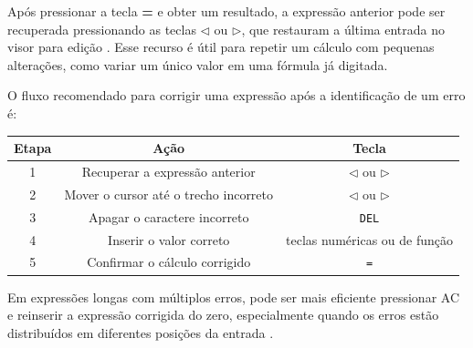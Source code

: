 Após pressionar a tecla \textbf{=} e obter um resultado, a expressão anterior pode ser recuperada pressionando as teclas $\triangleleft$ ou $\triangleright$, que restauram a última entrada no visor para edição \cite{casio2004}. Esse recurso é útil para repetir um cálculo com pequenas alterações, como variar um único valor em uma fórmula já digitada.

O fluxo recomendado para corrigir uma expressão após a identificação de um erro é:

\begin{table}[H]
    \centering
    \begin{tabular}{|c|c|c|}
        \hline
        \textbf{Etapa} & \textbf{Ação} & \textbf{Tecla} \\ \hline
        1 & Recuperar a expressão anterior & $\triangleleft$ ou $\triangleright$ \\
        2 & Mover o cursor até o trecho incorreto & $\triangleleft$ ou $\triangleright$ \\
        3 & Apagar o caractere incorreto & \texttt{DEL} \\
        4 & Inserir o valor correto & teclas numéricas ou de função \\
        5 & Confirmar o cálculo corrigido & \texttt{=} \\ \hline
    \end{tabular}
\end{table}

Em expressões longas com múltiplos erros, pode ser mais eficiente pressionar AC e reinserir a expressão corrigida do zero, especialmente quando os erros estão distribuídos em diferentes posições da entrada \cite{casio2004}.